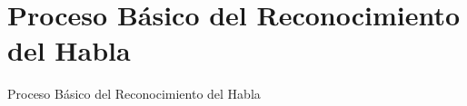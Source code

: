 \section{Proceso B\'asico del Reconocimiento del Habla}

\begin{frame}{Proceso B\'asico del Reconocimiento del Habla}
\end{frame}
